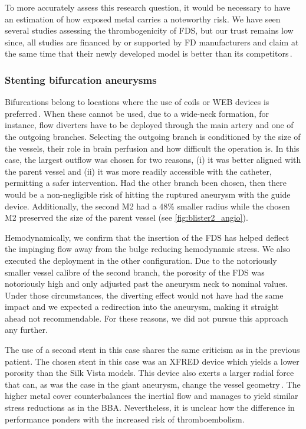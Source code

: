 To more accurately assess this research question, it would be necessary to have an estimation of how exposed metal carries a noteworthy risk. We have seen several studies assessing the thrombogenicity of FDS, but our trust remains low since, all studies are financed by or supported by FD manufacturers and claim at the same time that their newly developed model is better than its competitors\,\cite{GIRBAS2024100666, Girdhar2018}.


\subsubsection*{Stenting bifurcation aneurysms}
Bifurcations belong to locations where the use of coils or WEB devices is preferred\,\cite{Dandapat2021}. When these cannot be used, due to a wide-neck formation, for instance, flow diverters have to be deployed through the main artery and one of the outgoing branches. Selecting the outgoing branch is conditioned by the size of the vessels, their role in brain perfusion and how difficult the operation is. In this case, the largest outflow was chosen for two reasons, (i) it was better aligned with the parent vessel and (ii) it was more readily accessible with the catheter, permitting a safer intervention. Had the other branch been chosen, then there would be a non-negligible risk of hitting the ruptured aneurysm with the guide device. Additionally, the second M2 had a 48\% smaller radius while the chosen M2 preserved the size of the parent vessel (see \autoref{fig:blister2_angio}).

Hemodynamically, we confirm that the insertion of the FDS has helped deflect the impinging flow away from the bulge reducing hemodynamic stress. We also executed the deployment in the other configuration. Due to the notoriously smaller vessel calibre of the second branch, the porosity of the FDS was notoriously high and only adjusted past the aneurysm neck to nominal values. Under those circumstances, the diverting effect would not have had the same impact and we expected a redirection into the aneurysm, making it straight ahead not recommendable. For these reasons, we did not pursue this approach any further.

The use of a second stent in this case shares the same criticism as in the previous patient. The chosen stent in this case was an XFRED device which yields a lower porosity than the Silk Vista models. This device also exerts a larger radial force that can, as was the case in the giant aneurysm, change the vessel geometry\,\cite{Maragkos2020}. The higher metal cover counterbalances the inertial flow and manages to yield similar stress reductions as in the BBA\@. Nevertheless, it is unclear how the difference in performance ponders with the increased risk of thromboembolism.

